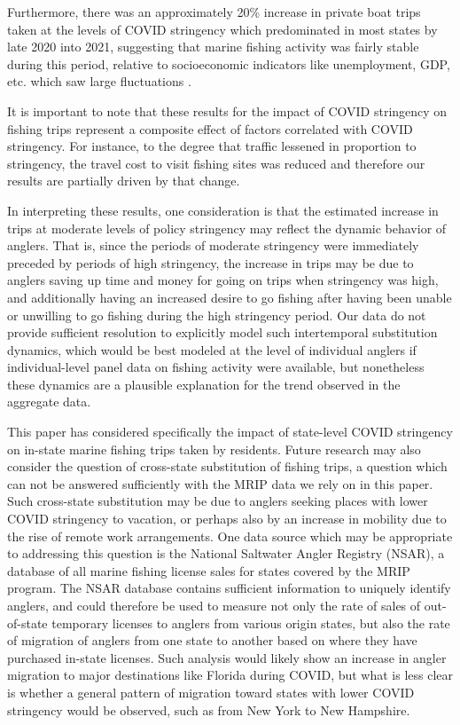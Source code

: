 \documentclass[12pt]{article}
\begin{document}
Furthermore, there was an approximately
20\% increase in private boat trips taken at the levels of COVID
stringency which predominated in most states by late 2020 into 2021,
suggesting that marine fishing activity was fairly stable
during this period, relative to socioeconomic indicators
like unemployment, GDP, etc. which saw large fluctuations \citep{vavra2021Tracking}. %

It is important to note that these results for the impact of COVID
stringency on fishing trips represent a composite effect of factors
correlated with COVID stringency. For instance, to the degree that
traffic lessened in proportion to stringency, the travel cost to visit
fishing sites was reduced and therefore our results are partially driven
by that change.

In interpreting these results, one consideration is that the estimated
increase in trips at moderate levels of policy stringency may reflect
the dynamic behavior of anglers. That is, since the periods of moderate
stringency were immediately preceded by periods of high stringency, the
increase in trips may be due to anglers saving up time and money for
going on trips when stringency was high, and additionally having an
increased desire to go fishing after having been unable or unwilling to
go fishing during the high stringency period. Our data do not provide
sufficient resolution to explicitly model such intertemporal
substitution dynamics, which would be best modeled at the level of
individual anglers if individual-level panel data on fishing activity
were available, but nonetheless these dynamics are a plausible
explanation for the trend observed in the aggregate data.


This paper has considered specifically the impact of state-level COVID
stringency on in-state marine fishing trips taken by residents. Future
research may also consider the question of cross-state substitution of
fishing trips, a question which can not be answered sufficiently with
the MRIP data we rely on in this paper. Such cross-state substitution
may be due to anglers seeking places with lower COVID stringency to
vacation, or perhaps also by an increase in mobility due to the rise of
remote work arrangements. One data source which may be appropriate to
addressing this question is the National Saltwater Angler Registry
(NSAR), a database of all marine fishing license sales for states
covered by the MRIP program. The NSAR database contains sufficient
information to uniquely identify anglers, and could therefore be used to
measure not only the rate of sales of out-of-state temporary licenses to
anglers from various origin states, but also the rate of migration of
anglers from one state to another based on where they have purchased
in-state licenses. Such analysis would likely show an increase in angler
migration to major destinations like Florida during COVID, but what is
less clear is whether a general pattern of migration toward states with
lower COVID stringency would be observed, such as from New York to New
Hampshire.
\end{document}
